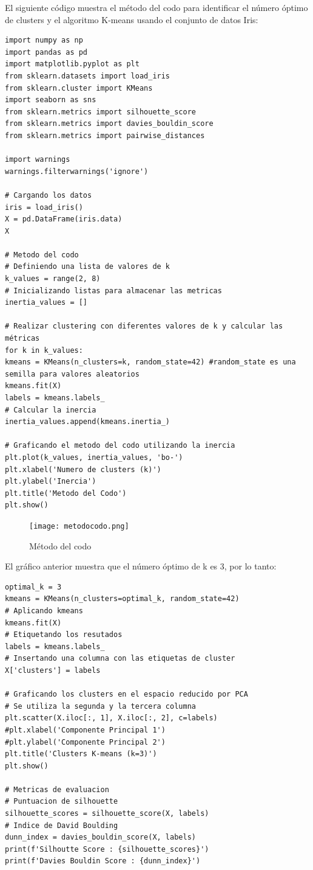 \documentclass[a4paper, 12pt]{book}
\begin{document}
El siguiente código muestra el método del codo para identificar el número óptimo de clusters y el algoritmo K-means usando el conjunto de datos Iris:
\begin{verbatim}
import numpy as np
import pandas as pd
import matplotlib.pyplot as plt
from sklearn.datasets import load_iris
from sklearn.cluster import KMeans
import seaborn as sns
from sklearn.metrics import silhouette_score
from sklearn.metrics import davies_bouldin_score
from sklearn.metrics import pairwise_distances

import warnings
warnings.filterwarnings('ignore')

# Cargando los datos
iris = load_iris()
X = pd.DataFrame(iris.data)
X

# Metodo del codo
# Definiendo una lista de valores de k
k_values = range(2, 8)
# Inicializando listas para almacenar las metricas
inertia_values = []

# Realizar clustering con diferentes valores de k y calcular las métricas
for k in k_values:
kmeans = KMeans(n_clusters=k, random_state=42) #random_state es una semilla para valores aleatorios
kmeans.fit(X)
labels = kmeans.labels_
# Calcular la inercia
inertia_values.append(kmeans.inertia_)

# Graficando el metodo del codo utilizando la inercia
plt.plot(k_values, inertia_values, 'bo-')
plt.xlabel('Numero de clusters (k)')
plt.ylabel('Inercia')
plt.title('Metodo del Codo')
plt.show()
\end{verbatim}
\begin{figure}[H]
	\centering
	\texttt{[image: metodocodo.png]}
	\caption{Método del codo}
\end{figure}
El gráfico anterior muestra que el número óptimo de k es 3, por lo tanto:
\begin{verbatim}
optimal_k = 3
kmeans = KMeans(n_clusters=optimal_k, random_state=42)
# Aplicando kmeans
kmeans.fit(X)
# Etiquetando los resutados
labels = kmeans.labels_
# Insertando una columna con las etiquetas de cluster
X['clusters'] = labels 

# Graficando los clusters en el espacio reducido por PCA
# Se utiliza la segunda y la tercera columna
plt.scatter(X.iloc[:, 1], X.iloc[:, 2], c=labels)
#plt.xlabel('Componente Principal 1')
#plt.ylabel('Componente Principal 2')
plt.title('Clusters K-means (k=3)')
plt.show()

# Metricas de evaluacion
# Puntuacion de silhouette
silhouette_scores = silhouette_score(X, labels)
# Indice de David Boulding
dunn_index = davies_bouldin_score(X, labels)
print(f'Silhoutte Score : {silhouette_scores}')
print(f'Davies Bouldin Score : {dunn_index}')
\end{verbatim}
\end{document}
